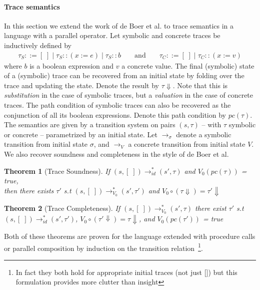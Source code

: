 \documentclass[submission,copyright,creativecommons]{eptcs}
\newtheorem{theorem}{Theorem}
\begin{document}
\paragraph{Trace semantics}
In this section we extend the work of de Boer et al. to trace semantics in a language with a parallel operator.
Let symbolic and concrete traces be inductively defined by
\begin{align*}
  \tau_{S} ::= [\;] \mid \tau_{S} :: (x := e) \mid \tau_{S} :: b
  && \mbox{ and } &&
  \tau_{C} ::= [\;] \mid \tau_{C} :: (x := v)
\end{align*}
where $b$ is a boolean expression and $v$ a concrete value.
The final (symbolic) state of a (symbolic) trace can be recovered from an initial state by folding over
the trace and updating the state. Denote the result by $\tau\Downarrow$. Note that this is \emph{substitution}
in the case of symbolic traces, but a \emph{valuation} in the case of concrete traces.
The path condition of symbolic traces can also be recovered as the conjunction of all its boolean expressions.
Denote this path condition by $pc(\tau)$.
The semantics are given by a transition system on pairs $(s, \tau)$ -- with $\tau$ symbolic or concrete --
parametrized by an initial state. Let $\rightarrow_{\sigma}$ denote a symbolic transition from initial state $\sigma$,
and $\rightarrow_{V}$ a concrete transition from initial state $V$.
We also recover soundness and completeness in the style of de Boer et al.
\begin{theorem}[Trace Soundness]
  If $(s, [\;]) \rightarrow_{id}^{*} (s', \tau)$ and $V_{0}(pc(\tau))$ = true,\\
  then there exists $\tau'$ s.t $(s, [\;]) \rightarrow_{V_0}^{*} (s', \tau')$ and
    $V_{0} \circ (\tau\Downarrow) = \tau'\Downarrow$
\end{theorem}

\begin{theorem}[Trace Completeness]
  If $(s, [\;]) \rightarrow_{V_{0}}^{*} (s', \tau)$ there exist $\tau'$ s.t \\
  $(s, [\;]) \rightarrow_{id}^{*} (s', \tau')$, $V_{0} \circ (\tau' \Downarrow) = \tau\Downarrow$,
  and $V_{0}(pc(\tau'))$ = true
\end{theorem}
Both of these theorems are proven for the language extended with procedure calls or parallel composition
by induction on the transition relation~\footnote{In fact they both hold for appropriate initial traces (not just [])
but this formulation provides more clutter than insight}.
\end{document}
